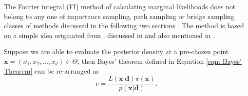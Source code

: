 \documentclass[%
 reprint,
 amsmath,amssymb,
 aps,
]{revtex4-2}
\def\ybold{\mathbf{d}}
\def\xbold{\mathbf{x}}
\newcommand{\btheta}{\mbox{\boldmath $\theta$}}
\begin{document}
The Fourier integral (FI) method of calculating marginal likelihoods does not belong to any one of importance sampling, path sampling or bridge sampling classes of methods discussed in the following two sections . The method is based on a simple idea originated from \cite{chib1995marginal}, discussed in \cite{chib2001marginal} and also mentioned in \cite{raftery1995hypothesis}. 

Suppose we are able to evaluate the posterior density at a pre-chosen point $\mathbf{x} = (x_1, x_2, \ldots, x_d) \in \Theta$, then Bayes' theorem  defined in Equation \eqref{eqn: Bayes' Theorem} can be re-arranged as
\begin{equation} \label{eqn: re-arranged Bayes' Theorem for FI method}
    c = \frac{L(\xbold | \ybold)\pi(\xbold)}{p(\xbold | \ybold)}.
\end{equation}

\end{document}
